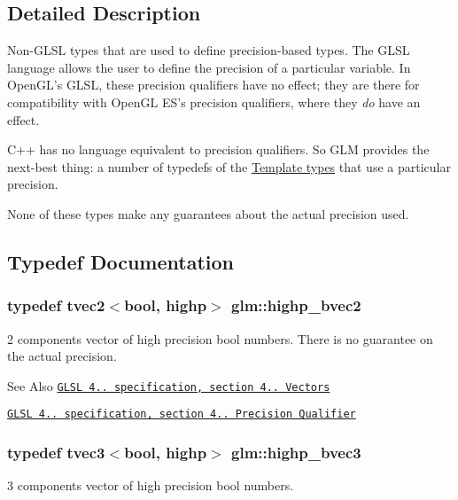 \subsection{Detailed Description}
Non-\/\-G\-L\-S\-L types that are used to define precision-\/based types. The G\-L\-S\-L language allows the user to define the precision of a particular variable. In Open\-G\-L's G\-L\-S\-L, these precision qualifiers have no effect; they are there for compatibility with Open\-G\-L E\-S's precision qualifiers, where they {\itshape do} have an effect.

C++ has no language equivalent to precision qualifiers. So G\-L\-M provides the next-\/best thing\-: a number of typedefs of the \hyperlink{group__core__template}{Template types} that use a particular precision.

None of these types make any guarantees about the actual precision used. 

\subsection{Typedef Documentation}
\hypertarget{group__core__precision_gaf76ced5823e8aace6bd257fac6c250cb}{
\subsubsection[{highp\-\_\-bvec2}]{\setlength{\rightskip}{0pt plus 5cm}typedef tvec2$<$bool, highp$>$ {\bf glm\-::highp\-\_\-bvec2}}}\label{group__core__precision_gaf76ced5823e8aace6bd257fac6c250cb}
2 components vector of high precision bool numbers. There is no guarantee on the actual precision.

\begin{DoxySeeAlso}{See Also}
\href{http://www.opengl.org/registry/doc/GLSLangSpec.4.20.8.pdf}{\tt G\-L\-S\-L 4.. specification, section 4.. Vectors} 

\href{http://www.opengl.org/registry/doc/GLSLangSpec.4.20.8.pdf}{\tt G\-L\-S\-L 4.. specification, section 4.. Precision Qualifier} 
\end{DoxySeeAlso}
\hypertarget{group__core__precision_gac35c0ff5b9eead09e905b4aa09d1e954}{
\subsubsection[{highp\-\_\-bvec3}]{\setlength{\rightskip}{0pt plus 5cm}typedef tvec3$<$bool, highp$>$ {\bf glm\-::highp\-\_\-bvec3}}}\label{group__core__precision_gac35c0ff5b9eead09e905b4aa09d1e954}
3 components vector of high precision bool numbers.

